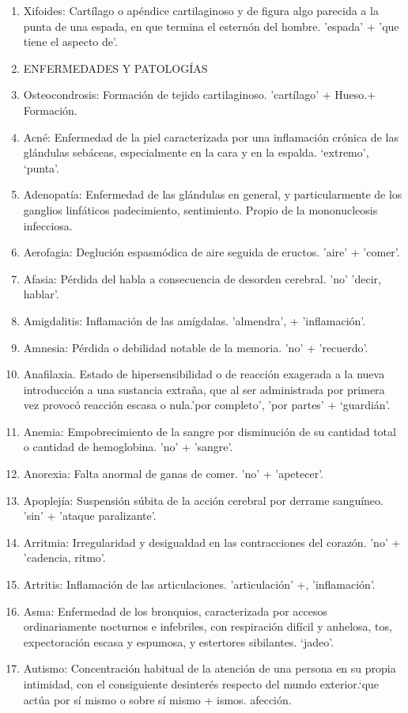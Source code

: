 \documentclass{mylib/reporte}
\begin{document}
\begin{enumerate}
	\item Xifoides: Cartílago o apéndice cartilaginoso y de figura algo parecida a la punta de una espada, en que termina el esternón del hombre. 'espada' + 'que tiene el aspecto de'.
	\item ENFERMEDADES Y PATOLOGÍAS
	\item Osteocondrosis: Formación de tejido cartilaginoso. 'cartílago' + Hueso.+ Formación.
	\item Acné: Enfermedad de la piel caracterizada por una inflamación crónica de las glándulas sebáceas, especialmente en la cara y en la espalda. ‘extremo’, ‘punta’.
	\item Adenopatía: Enfermedad de las glándulas en general, y particularmente de los ganglios linfáticos padecimiento, sentimiento. Propio de la mononucleosis infecciosa.
	\item Aerofagia: Deglución espasmódica de aire seguida de eructos. 'aire' + 'comer'.
	\item Afasia: Pérdida del habla a consecuencia de desorden cerebral.  'no' 'decir, hablar'.
	\item Amigdalitis: Inflamación de las amígdalas. 'almendra', +  'inflamación'.
	\item Amnesia: Pérdida o debilidad notable de la memoria. 'no' + 'recuerdo'.
	\item Anafilaxia. Estado de hipersensibilidad o de reacción exagerada a la nueva introducción a una sustancia extraña, que al ser administrada por primera vez provocó reacción escasa o nula.'por completo', 'por partes' +  ‘guardián’.
	\item Anemia: Empobrecimiento de la sangre por disminución de su cantidad total o cantidad de hemoglobina. 'no' + 'sangre'.
	\item Anorexia: Falta anormal de ganas de comer. 'no' +  'apetecer'.
	\item Apoplejía: Suspensión súbita de la acción cerebral por derrame sanguíneo. 'sin' + 'ataque paralizante'.
	\item Arritmia: Irregularidad y desigualdad en las contracciones del corazón. 'no' + 'cadencia, ritmo'.
	\item Artritis: Inflamación de las articulaciones.  'articulación' +, 'inflamación'.
	\item Asma: Enfermedad de los bronquios, caracterizada por accesos ordinariamente nocturnos e infebriles, con respiración difícil y anhelosa, tos, expectoración escasa y espumosa, y estertores sibilantes. ‘jadeo’.
	\item Autismo: Concentración habitual de la atención de una persona en su propia intimidad, con el consiguiente desinterés respecto del mundo exterior.‘que actúa por sí mismo o sobre sí mismo + ismos. afección.

\end{enumerate}
\end{document}
